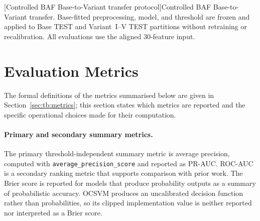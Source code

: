 \begin{minipage}{\linewidth}
[Controlled BAF Base-to-Variant transfer protocol]{Controlled BAF Base-to-Variant transfer. Base-fitted preprocessing, model, and threshold are frozen and applied to Base TEST and Variant~I--V TEST partitions without retraining or recalibration. All evaluations use the aligned 30-feature input.}
\label{fig:cross_domain}
\end{minipage}\par\medskip

\clearpage

\section{Evaluation Metrics}
\label{sec:metrics}

The formal definitions of the metrics summarised below are given in Section~\ref{sec:tb:metrics}; this section states which metrics are reported and the specific operational choices made for their computation.

\paragraph{Primary and secondary summary metrics.}
The primary threshold-independent summary metric is average precision, computed with \texttt{average\_precision\_score} and reported as PR-AUC. ROC-AUC is a secondary ranking metric that supports comparison with prior work. The Brier score is reported for models that produce probability outputs as a summary of probabilistic accuracy. OCSVM produces an uncalibrated decision function rather than probabilities, so its clipped implementation value is neither reported nor interpreted as a Brier score.


